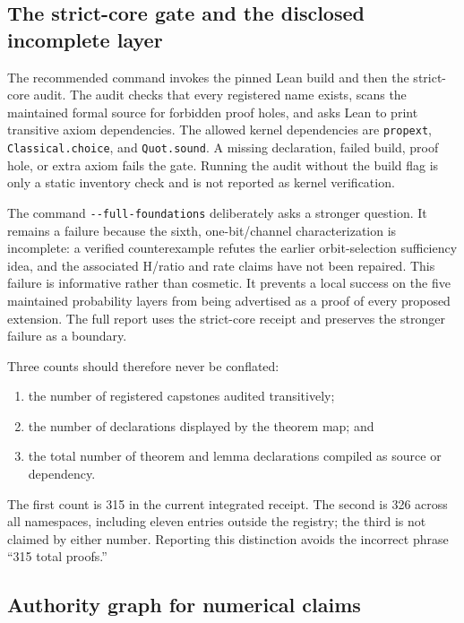 \subsection{The strict-core gate and the disclosed incomplete layer}
\label{fr:strict-core-gate}

The recommended command invokes the pinned Lean build and then the strict-core audit.  The audit
checks that every registered name exists, scans the maintained formal source for forbidden proof
holes, and asks Lean to print transitive axiom dependencies.  The allowed kernel dependencies are
\texttt{propext}, \texttt{Classical.choice}, and \texttt{Quot.sound}.  A missing declaration,
failed build, proof hole, or extra axiom fails the gate.  Running the audit without the build flag
is only a static inventory check and is not reported as kernel verification.

The command \texttt{-{}-full-foundations} deliberately asks a stronger question.  It remains a
failure because the sixth, one-bit/channel characterization is incomplete: a verified
counterexample refutes the earlier orbit-selection sufficiency idea, and the associated H/ratio
and rate claims have not been repaired.  This failure is informative rather than cosmetic.  It
prevents a local success on the five maintained probability layers from being advertised as a
proof of every proposed extension.  The full report uses the strict-core receipt and preserves the
stronger failure as a boundary.

Three counts should therefore never be conflated:

\begin{enumerate}[leftmargin=*]
\item the number of registered capstones audited transitively;
\item the number of declarations displayed by the theorem map; and
\item the total number of theorem and lemma declarations compiled as source or dependency.
\end{enumerate}

The first count is 315 in the current integrated receipt. The second is 326 across all
namespaces, including eleven entries outside the registry; the third is not claimed by
either number. Reporting this distinction avoids the incorrect phrase ``315 total proofs.''

\subsection{Authority graph for numerical claims}
\label{fr:authority-graph}

